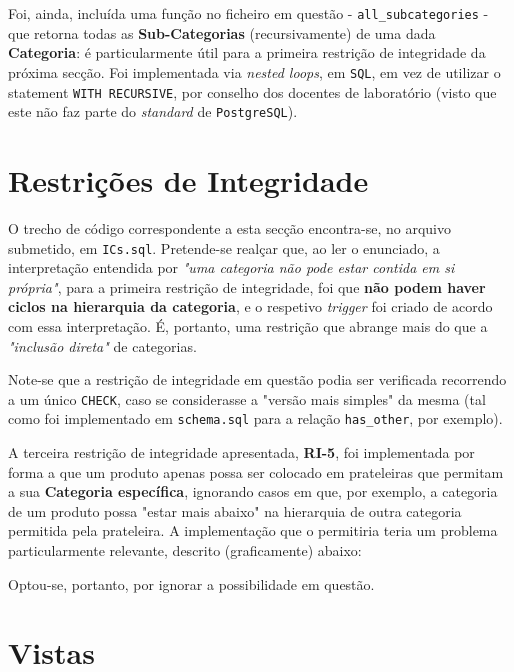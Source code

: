 \documentclass[12pt,a4paper]{article}
\begin{document}
Foi, ainda, incluída uma função no ficheiro em questão - \texttt{all\_subcategories} -
que retorna todas as \textbf{Sub-Categorias} (recursivamente) de uma dada \textbf{Categoria}:
é particularmente útil para a primeira restrição de integridade da próxima secção.
Foi implementada via \textit{nested loops}, em \texttt{SQL}, em vez de utilizar
o statement \texttt{WITH RECURSIVE}, por conselho dos docentes de laboratório
(visto que este não faz parte do \textit{standard} de \texttt{PostgreSQL}).

\section*{Restrições de Integridade}

O trecho de código correspondente a esta secção encontra-se, no arquivo submetido,
em \texttt{ICs.sql}. Pretende-se realçar que, ao ler o enunciado, a interpretação
entendida por \textit{"uma categoria não pode estar contida em si própria"}, para
a primeira restrição de integridade, foi que \textbf{não podem haver ciclos na
  hierarquia da categoria}, e o respetivo \textit{trigger} foi criado de acordo
com essa interpretação. É, portanto, uma restrição que abrange mais do que
a \textit{"inclusão direta"} de categorias.

Note-se que a restrição de integridade em questão podia ser verificada recorrendo
a um único \texttt{CHECK}, caso se considerasse a "versão mais simples" da mesma (tal
como foi implementado em \texttt{schema.sql} para a relação \texttt{has\_other},
por exemplo).

A terceira restrição de integridade apresentada, \textbf{RI-5}, foi implementada
por forma a que um produto apenas possa ser colocado em prateleiras que permitam
a sua \textbf{Categoria específica}, ignorando casos em que, por exemplo, a categoria
de um produto possa "estar mais abaixo" na hierarquia de outra categoria permitida
pela prateleira. A implementação que o permitiria teria um problema particularmente
relevante, descrito (graficamente) abaixo:


\begin{center}
  
\end{center}

Optou-se, portanto, por ignorar a possibilidade em questão.

\section*{Vistas}
\end{document}
